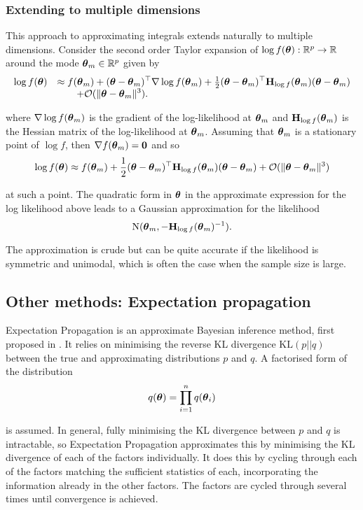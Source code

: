 \subsubsection{Extending to multiple dimensions}

This approach to approximating integrals extends naturally to multiple
dimensions. Consider the second order Taylor expansion of $\log f({\boldsymbol \theta}): {\mathbb{R}}^p
\to {\mathbb{R}}$ around the mode ${\boldsymbol \theta}_m \in {\mathbb{R}}^p$ given by
$$
\begin{array}{rl}
\displaystyle \log f({\boldsymbol \theta}) 
& \displaystyle \approx f({\boldsymbol \theta}_m) + ({\boldsymbol \theta} - {\boldsymbol \theta}_m)^\top \nabla \log f({\boldsymbol \theta}_m) + \tfrac{1}{2} ({\boldsymbol \theta} - {\boldsymbol \theta}_m)^\top {\bf H}_{\log f}({\boldsymbol \theta}_m) ({\boldsymbol \theta} - {\boldsymbol \theta}_m)
\\
& \displaystyle  \qquad 
+ \mathcal{O}(\|{\boldsymbol \theta} - {\boldsymbol \theta}_m\|^3).
\end{array} 
$$

\noindent 
where $\nabla \log f({\boldsymbol \theta}_m)$ is the gradient of the log-likelihood at
${\boldsymbol \theta}_m$ and ${\bf H}_{\log f}({\boldsymbol \theta}_m)$ is the Hessian matrix of the
log-likelihood at ${\boldsymbol \theta}_m$. Assuming that ${\boldsymbol \theta}_m$ is a stationary point
of $\log f$, then $\nabla f({\boldsymbol \theta}_m) = {\bf 0}$ and so
$$
\log f({\boldsymbol \theta}) \approx f({\boldsymbol \theta}_m) + \frac{1}{2} ({\boldsymbol \theta} - {\boldsymbol \theta}_m)^\top {\bf H}_{\log f}({\boldsymbol \theta}_m) ({\boldsymbol \theta} - {\boldsymbol \theta}_m) + \mathcal{O}(\|{\boldsymbol \theta} - {\boldsymbol \theta}_m\|^3)
$$

\noindent at such a point. The quadratic form in ${\boldsymbol \theta}$ in the approximate
expression for the log likelihood above leads to a Gaussian approximation for
the likelihood 
$$
\text{N}({\boldsymbol \theta}_m, -{\bf H}_{\log f}({\boldsymbol \theta}_m)^{-1}).
$$ 

\noindent 
The approximation
is crude but can be quite accurate if the likelihood is symmetric and unimodal, which is often the case when the sample size is large.

\subsection{Other methods: Expectation propagation}

Expectation Propagation is an approximate Bayesian inference method, first
proposed in \cite{Minka2001}.  It relies on minimising the reverse KL
divergence $\text{KL}(p || q)$ between the true and approximating distributions
$p$ and $q$. A factorised form of the distribution
\[
	q({\boldsymbol \theta}) = \prod_{i=1}^n q({\boldsymbol \theta}_i)
\]

\noindent 
is assumed. In general, fully minimising the KL divergence between $p$ and $q$
is intractable, so Expectation Propagation approximates this by minimising the
KL divergence of each of the factors individually.  It does this by cycling
through each of the factors matching the sufficient statistics of each,
incorporating the information already in the other factors.
The factors are cycled through several times until convergence is achieved.

